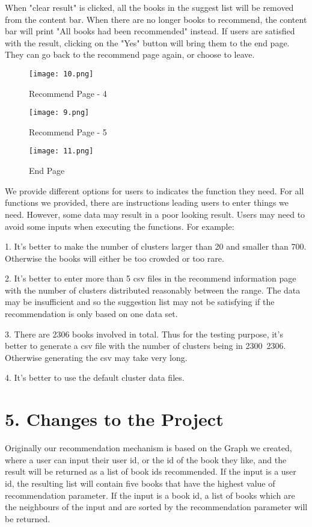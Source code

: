 \documentclass[fontsize=11pt]{article}
\begin{document}
\qquad When "clear result" is clicked, all the books in the suggest list will be removed from the content bar. When there are no longer books to recommend, the content bar will print "All books had been recommended" instead. If users are satisfied with the result, clicking on the "Yes" button will bring them to the end page. They can go back to the recommend page again, or choose to leave. 

\begin{figure}[h]
   \begin{minipage}{0.33\textwidth}
     \centering
     \texttt{[image: 10.png]}
     \caption{Recommend Page - 4}\label{Fig:Data1}
   \end{minipage}\hfill
   \begin{minipage}{0.33\textwidth}
     \centering
     \texttt{[image: 9.png]}
     \caption{Recommend Page - 5}\label{Fig:Data2}
   \end{minipage}
   \begin{minipage}{0.33\textwidth}
     \centering
     \texttt{[image: 11.png]}
     \caption{End Page}\label{Fig:Data2}
   \end{minipage}

\end{figure}

\qquad We provide different options for users to indicates the function they need. For all functions we provided, there are instructions leading users to enter things we need. However, some data may result in a poor looking result. Users may need to avoid some inputs when executing the functions. For example:

1. It's better to make the number of clusters larger than 20 and smaller than 700. Otherwise the books will either be too crowded or too rare.

2. It's better to enter more than 5 csv files in the recommend information page with the number of clusters distributed reasonably between the range. The data may be insufficient and so the suggestion list may not be satisfying if the recommendation is only based on one data set.

3. There are 2306 books involved in total. Thus for the testing purpose, it's better to generate a csv file with the number of clusters being in 2300~2306. Otherwise generating the csv may take very long.

4. It's better to use the default cluster data files.


\section*{5. Changes to the Project }
Originally our recommendation mechanism is based on the Graph we created, where a user can input their user id, or the id of the book they like, and the result will be returned as a list of book ids recommended. If the input is a user id, the resulting list will contain five books that have the highest value of recommendation parameter. If the input is a book id, a list of books which are the neighbours of the input and are sorted by the recommendation parameter will be returned.\\
\end{document}
